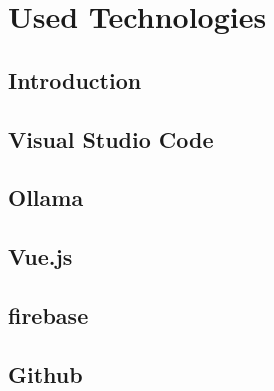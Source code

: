 \chapter{Used Technologies} %
\label{chap:used_technologies}

\section{Introduction}


\section{Visual Studio Code}

\section{Ollama}

\section{Vue.js}

\section{firebase}

\section{Github} %



